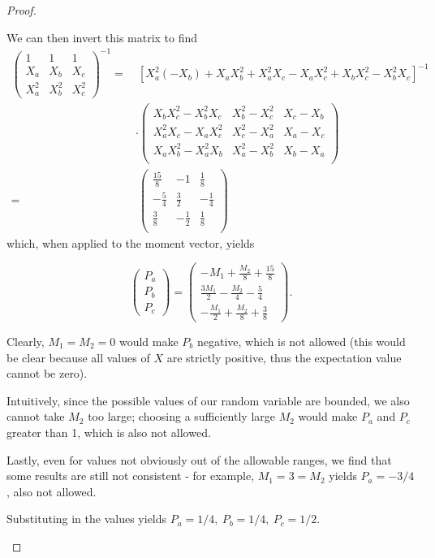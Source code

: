 \begin{proof}
\begin{parts}
	We can then invert this matrix to find
	\begin{align*}
		\begin{pmatrix} 1 & 1 & 1 \\ X_a & X_b & X_c \\ X_a^2 & X_b^2 & X_c^2 \end{pmatrix}^{-1} =&~\left[X_a^2 \left(-X_b\right)+X_a X_b^2+X_a^2 X_c-X_a X_c^2+X_b X_c^2-X_b^2 X_c\right]^{-1} \\
				  &\cdot\left(
\begin{array}{ccc}
 X_b X_c^2-X_b^2 X_c & X_b^2-X_c^2 & X_c-X_b \\
 X_a^2 X_c-X_a X_c^2 & X_c^2-X_a^2 & X_a-X_c \\
 X_a X_b^2-X_a^2 X_b & X_a^2-X_b^2 & X_b-X_a \\
\end{array}
\right)\\ 
		=&~\left(
\begin{array}{ccc}
 \frac{15}{8} & -1 & \frac{1}{8} \\
 -\frac{5}{4} & \frac{3}{2} & -\frac{1}{4} \\
 \frac{3}{8} & -\frac{1}{2} & \frac{1}{8} \\
\end{array}
\right) 
	\end{align*}
	which, when applied to the moment vector, yields

	\[
	\begin{pmatrix} P_a \\ P_b \\ P_c \end{pmatrix} =
\begin{pmatrix}  -M_1+\frac{M_2}{8}+\frac{15}{8}\\\frac{3 M_1}{2}-\frac{M_2}{4}-\frac{5}{4}\\-\frac{M_1}{2}+\frac{M_2}{8}+\frac{3}{8} \end{pmatrix} 
	.\] 
\item Clearly, $M_1=M_2=0$ would make $P_b$ negative, which is not allowed (this would be clear because all values of $X$ are strictly positive, thus the expectation value cannot be zero).

Intuitively, since the possible values of our random variable are bounded, we also cannot take $M_2$ too large; choosing a sufficiently large $M_2$ would make $P_a$ and $P_c$ greater than 1, which is also not allowed.

Lastly, even for values not obviously out of the allowable ranges, we find that some results are still not consistent - for example, $M_1=3=M_2$ yields $P_a=-3/4$, also not allowed.
\item Substituting in the values yields $P_a=1 / 4,~P_b = 1 / 4, ~P_c=1 / 2$.


\end{parts}
\end{proof}
